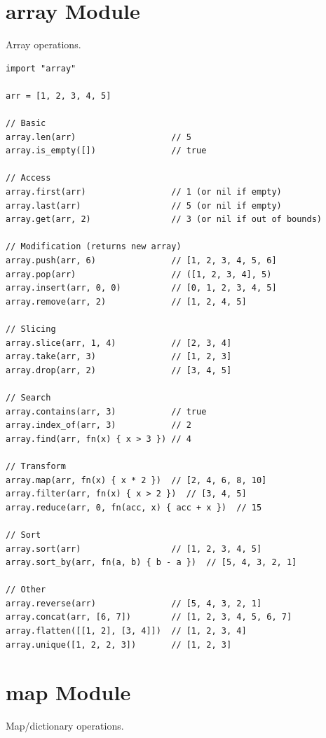 \section{array Module}

Array operations.

\begin{lstlisting}
import "array"

arr = [1, 2, 3, 4, 5]

// Basic
array.len(arr)                   // 5
array.is_empty([])               // true

// Access
array.first(arr)                 // 1 (or nil if empty)
array.last(arr)                  // 5 (or nil if empty)
array.get(arr, 2)                // 3 (or nil if out of bounds)

// Modification (returns new array)
array.push(arr, 6)               // [1, 2, 3, 4, 5, 6]
array.pop(arr)                   // ([1, 2, 3, 4], 5)
array.insert(arr, 0, 0)          // [0, 1, 2, 3, 4, 5]
array.remove(arr, 2)             // [1, 2, 4, 5]

// Slicing
array.slice(arr, 1, 4)           // [2, 3, 4]
array.take(arr, 3)               // [1, 2, 3]
array.drop(arr, 2)               // [3, 4, 5]

// Search
array.contains(arr, 3)           // true
array.index_of(arr, 3)           // 2
array.find(arr, fn(x) { x > 3 }) // 4

// Transform
array.map(arr, fn(x) { x * 2 })  // [2, 4, 6, 8, 10]
array.filter(arr, fn(x) { x > 2 })  // [3, 4, 5]
array.reduce(arr, 0, fn(acc, x) { acc + x })  // 15

// Sort
array.sort(arr)                  // [1, 2, 3, 4, 5]
array.sort_by(arr, fn(a, b) { b - a })  // [5, 4, 3, 2, 1]

// Other
array.reverse(arr)               // [5, 4, 3, 2, 1]
array.concat(arr, [6, 7])        // [1, 2, 3, 4, 5, 6, 7]
array.flatten([[1, 2], [3, 4]])  // [1, 2, 3, 4]
array.unique([1, 2, 2, 3])       // [1, 2, 3]
\end{lstlisting}

\section{map Module}

Map/dictionary operations.

